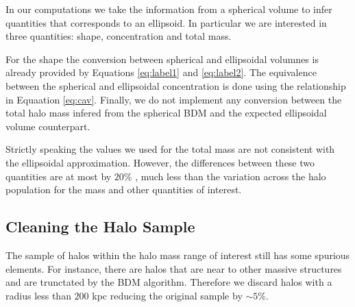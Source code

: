 In our computations we take the information from a spherical volume to
infer quantities that corresponds to an ellipsoid. In particular we
are interested in three quantities: shape, concentration and total
mass.

For the shape the conversion between spherical and
ellipsoidal volumnes is already provided by Equations \ref{eq:label1} and
\ref{eq:label2}. The equivalence between the spherical and ellipsoidal
concentration is done using the relationship in Equaation
\ref{eq:cav}. Finally, we do not implement any conversion between the
total halo mass infered from the spherical BDM and the expected
ellipsoidal volume counterpart. 

Strictly speaking the values we used for the total mass are not
consistent with the ellipsoidal approximation. However, the
differences between these two quantities are at most by $20\%$
\cite{2011MNRAS.411..584M}, much less than the variation across the
halo population for the mass and other quantities of interest. 


\subsection{Cleaning the Halo Sample}

The sample of halos within the halo mass range of interest still has
some spurious elements. For instance, there are halos that are near to
other massive structures and are trunctated by the BDM
algorithm. Therefore we discard halos with a radius less than $200$
kpc reducing the original sample by $\sim 5\%$. 
